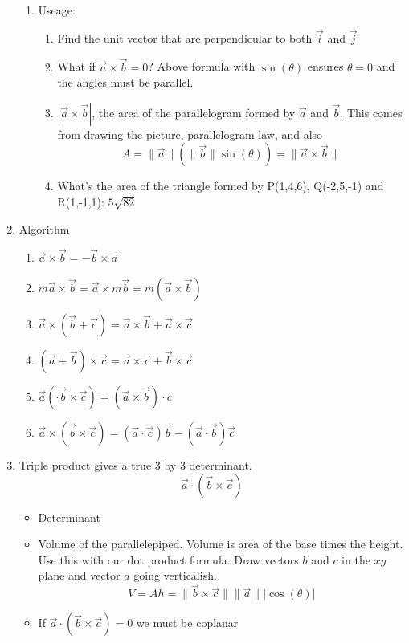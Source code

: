 \documentclass{article}
\begin{document}
\begin{enumerate}
\begin{enumerate}
\item Useage:
\begin{enumerate}
\item Find the unit vector that are perpendicular to both $\vec i$ and $\vec j$
\item What if $\vec a\times\vec b = 0$? Above formula with $\sin(\theta)$ ensures $\theta=0$ and the angles must be parallel.
\item $|\vec a \times\vec b|$, the area of the parallelogram formed by $\vec a$ and $\vec b$. This comes from drawing the picture, parallelogram law, and also
\[
A = \|\vec{a}\| (\|\vec{b}\| \sin(\theta) ) = \| \vec{a} \times \vec{b} \|
\]
\item [] What's the area of the triangle formed by P(1,4,6), Q(-2,5,-1) and R(1,-1,1): $5\sqrt{82}$
\end{enumerate}
\end{enumerate}

\item Algorithm
\begin{enumerate}
\item $\vec a\times\vec b = -\vec b\times\vec a$
\item $m\vec a\times\vec b = \vec a\times m\vec b = m(\vec a\times\vec b)$
\item $\vec a\times (\vec b+\vec c) = \vec a\times\vec b+\vec a \times\vec c$
\item $(\vec a+\vec b)\times\vec c = \vec a\times\vec c+\vec b\times\vec c $
\item $\vec a (\cdot\vec b\times\vec c) = (\vec a\times \vec b)\cdot c$
\item $\vec a\times(\vec b\times \vec c) = (\vec a\cdot\vec c)\vec b-(\vec a\cdot\vec b)\vec c$
\end{enumerate}

\item Triple product gives a true 3 by 3 determinant.
$$
\vec a\cdot(\vec b\times \vec c)
$$
\begin{itemize}
\item Determinant
\item Volume of the parallelepiped. Volume is area of the base times the height. Use this with our dot product formula. Draw vectors $b$ and $c$ in the $xy$ plane and vector $a$ going verticalish.
\[
V = A h = \|\vec{b} \times \vec{c}\| \|\vec{a} \| |\cos(\theta) |
\]
\item If $\vec a\cdot(\vec b\times\vec c) = 0$ we must be coplanar
\end{itemize}
\end{enumerate}
\end{document}
